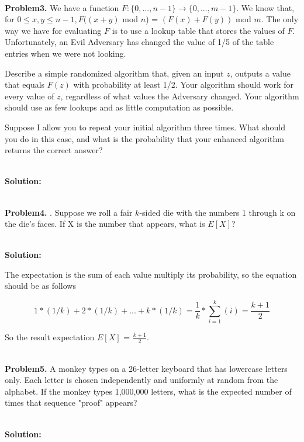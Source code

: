 \documentclass{article}
\begin{document}
~\\

\noindent \textbf{Problem3.} We have a function $F: \{0,...,n-1\} \rightarrow \{0,...,m-1\}$. We know that, for $0 \le x, y \le n - 1, F((x +y)$ mod $n$) = $(F(x) + F(y))$ mod $m$. The only way we have for evaluating $F$ is to use a lookup table that
stores the values of $F$. Unfortunately, an Evil Adversary has changed the value of 1/5 of the table entries
when we were not looking.

Describe a simple randomized algorithm that, given an input $z$, outputs a value that equals $F(z)$ with
probability at least 1/2. Your algorithm should work for every value of $z$, regardless of what values the
Adversary changed. Your algorithm should use as few lookups and as little computation as possible.


Suppose I allow you to repeat your initial algorithm three times. What should you do in this case, and
what is the probability that your enhanced algorithm returns the correct answer?

~\\

\noindent \textbf{Solution:}

~\\

\noindent \textbf{Problem4.} . Suppose we roll a fair $k$-sided die with the numbers 1 through k on the die's faces. If X is the number that appears, what is $E[X]$?

~\\

\noindent \textbf{Solution:}

The expectation is the sum of each value multiply its probability, so the equation should be as follows

$$ 1 * (1/k) + 2 * (1/k) + ... + k * (1/k) = \frac{1}{k} * \sum_{i=1}^{k}(i) = \frac{k+1}{2}$$

So the result expectation $E[X]$ = $\frac{k+1}{2}$.

~\\

\noindent \textbf{Problem5.} A monkey types on a 26-letter keyboard that has lowercase letters only. Each letter is chosen independently and uniformly at random from the alphabet. If the monkey types 1,000,000 letters, what is
the expected number of times that sequence "proof" appears?

~\\

\noindent \textbf{Solution:}



~\\ %
\end{document}
